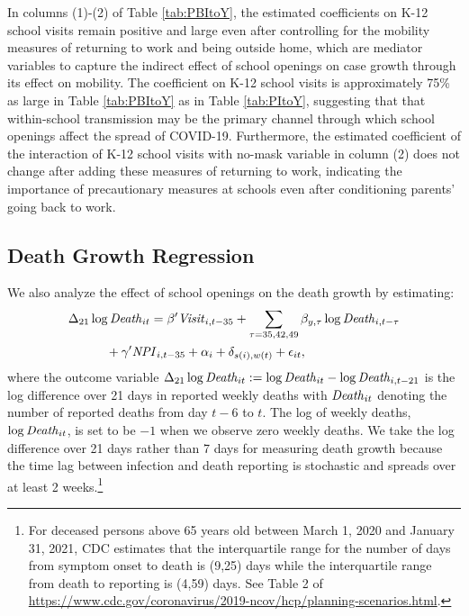 \documentclass[9pt,twocolumn,twoside,lineno]{pnas-new}
\begin{document}
In columns (1)-(2) of Table \ref{tab:PBItoY}, the estimated coefficients on K-12 school visits remain positive and large even after controlling for the mobility measures of returning to work and being outside home, which are mediator variables to capture the indirect effect of school openings on case growth through its effect on mobility. The coefficient on K-12 school visits is approximately 75\% as large in Table \ref{tab:PBItoY} as in Table \ref{tab:PItoY}, suggesting that that within-school transmission may be the primary channel through which school openings affect the spread of COVID-19. Furthermore, the estimated coefficient of the interaction of K-12 school visits with no-mask variable in column (2) does not change after adding these measures of returning to work, indicating the importance of precautionary measures at schools even after conditioning parents' going back to work. 

\subsection*{Death Growth Regression} We also analyze the effect of school openings on the death growth by estimating:
\begin{align}
&\Delta_{21} \log \text{\textit{Death}}_{it}  =  \beta' \text{\textit{Visit}}_{i,t-35}  +   \sum_{\tau=35,42,49} \beta_{y,\tau} \log \text{\textit{Death}}_{i,t-\tau}  \nonumber\\
&\quad\qquad+ \gamma' \text{\textit{NPI}}_{i,t-35} +\alpha_i + \delta_{s(i),w(t)} + \epsilon_{it},  \label{eq:panel-3}
\end{align}
where the outcome variable $\Delta_{21} \log \text{\textit{Death}}_{it} :=\log \text{\textit{Death}}_{it}-\log \text{\textit{Death}}_{i,t-21}$ is  the log difference  over 21 days in reported weekly deaths with $\text{\textit{Death}}_{it}$ denoting  the number of reported deaths from day $t-6$ to $t$. The log of weekly deaths, $\log \text{\textit{Death}}_{it}$, is set to be $-1$ when we observe zero weekly deaths. We take the log difference over 21 days rather than 7 days for measuring death growth because the time lag between infection and death reporting is stochastic and spreads over at least 2 weeks.\footnote{ For deceased persons above 65 years old between March 1, 2020 and January 31, 2021, CDC estimates that the interquartile range for the number of days from symptom onset to death is (9,25) days while the interquartile range from death to reporting is (4,59) days. See  Table 2 of \url{https://www.cdc.gov/coronavirus/2019-ncov/hcp/planning-scenarios.html}.  }
\end{document}
